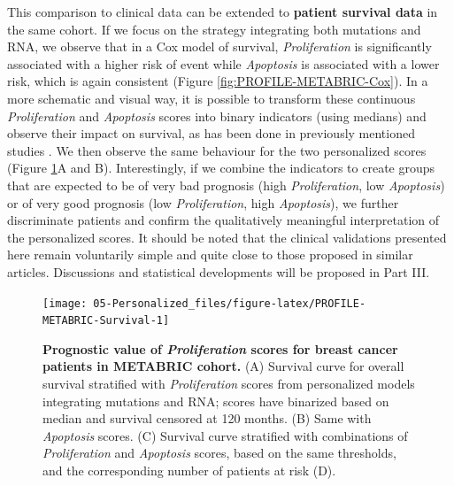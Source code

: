 \documentclass[a4paper,12pt,twoside,onecolumn,openright,final,oldfontcommands]{memoir}
\begin{document}
This comparison to clinical data can be extended to \textbf{patient
survival data} in the same cohort. If we focus on the strategy
integrating both mutations and RNA, we observe that in a Cox model of
survival, \emph{Proliferation} is significantly associated with a higher
risk of event while \emph{Apoptosis} is associated with a lower risk,
which is again consistent (Figure \ref{fig:PROFILE-METABRIC-Cox}). In a
more schematic and visual way, it is possible to transform these
continuous \emph{Proliferation} and \emph{Apoptosis} scores into binary
indicators (using medians) and observe their impact on survival, as has
been done in previously mentioned studies
\citep{fey2015signaling, salvucci2019system}. We then observe the same
behaviour for the two personalized scores (Figure
\ref{fig:PROFILE-METABRIC-Survival}A and B). Interestingly, if we
combine the indicators to create groups that are expected to be of very
bad prognosis (high \emph{Proliferation}, low \emph{Apoptosis}) or of
very good prognosis (low \emph{Proliferation}, high \emph{Apoptosis}),
we further discriminate patients and confirm the qualitatively
meaningful interpretation of the personalized scores. It should be noted
that the clinical validations presented here remain voluntarily simple
and quite close to those proposed in similar articles. Discussions and
statistical developments will be proposed in Part III.

\begin{figure}

{\centering \texttt{[image: 05-Personalized\_files/figure-latex/PROFILE-METABRIC-Survival-1]} 

}

\caption[Prognostic value of *Proliferation* scores for breast cancer patients in METABRIC cohort]{\textbf{Prognostic value of
\emph{Proliferation} scores for breast cancer patients in METABRIC
cohort.} (A) Survival curve for overall survival stratified with
\emph{Proliferation} scores from personalized models integrating
mutations and RNA; scores have binarized based on median and survival
censored at 120 months. (B) Same with \emph{Apoptosis} scores. (C)
Survival curve stratified with combinations of \emph{Proliferation} and
\emph{Apoptosis} scores, based on the same thresholds, and the
corresponding number of patients at risk (D).}\label{fig:PROFILE-METABRIC-Survival}
\end{figure}
\end{document}
